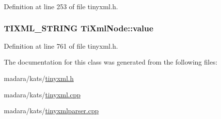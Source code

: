 Definition at line 253 of file tinyxml.h.

\hypertarget{classTiXmlNode_aead528b3cedc33c16a6c539872c7cc8b}{
\subsubsection[{value}]{\setlength{\rightskip}{0pt plus 5cm}TIXML\_\-STRING {\bf TiXmlNode::value}}}
\label{d3/dd5/classTiXmlNode_aead528b3cedc33c16a6c539872c7cc8b}


Definition at line 761 of file tinyxml.h.



The documentation for this class was generated from the following files:\begin{DoxyCompactItemize}
\item 
madara/kats/\hyperlink{tinyxml_8h}{tinyxml.h}\item 
madara/kats/\hyperlink{tinyxml_8cpp}{tinyxml.cpp}\item 
madara/kats/\hyperlink{tinyxmlparser_8cpp}{tinyxmlparser.cpp}\end{DoxyCompactItemize}
